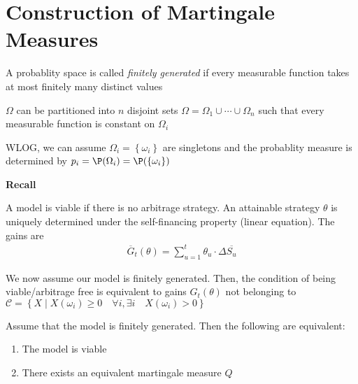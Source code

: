 \section{Construction of Martingale Measures}
\begin{defo}{}
  A probablity space is called \textit{finitely generated} if every measurable function takes at most finitely many distinct values
\end{defo}
\par\bigskip
\noindent $\Omega$ can be partitioned into $n$ disjoint sets $\Omega = \Omega_1\cup \cdots\cup \Omega_n$ such that every measurable function is constant on $\Omega_i$\par
\noindent WLOG, we can assume $\Omega_i = \left\{\omega_i\right\}$ are singletons and the probablity measure is determined by $p_i = \P(\Omega_i) = \P(\left\{\omega_i\right\})$
\par\bigskip
\noindent\textbf{Recall}\par
\noindent A model is viable if there is no arbitrage strategy. An attainable strategy $\theta$ is uniquely determined under the self-financing property (linear equation). The gains are
\begin{equation*}
  \begin{gathered}
    \overline{G}_t(\theta) = \sum_{u=1}^{t}\theta_u\cdot\Delta\overline{S_u}
  \end{gathered}
\end{equation*}\par
\noindent We now assume our model is finitely generated. Then, the condition of being viable/arbitrage free is equivalent to gains $G_t(\theta)$ not belonging to $\mathcal{C}= \left\{X\mid X(\omega_i)\geq0\quad\forall i, \exists i\quad X(\omega_i)>0\right\}$ 
\par\bigskip
\begin{theo}{}
  Assume that the model is finitely generated. Then the following are equivalent:\par
  \begin{enumerate}[leftmargin=*]
    \item The model is viable
    \item There exists an equivalent martingale measure $Q$
  \end{enumerate}
\end{theo}
\par\bigskip
